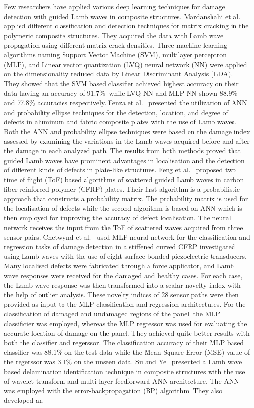 Few researchers have applied various deep learning techniques for damage detection with guided Lamb waves in composite structures. Mardanshahi et al.~\cite{mardanshahi2020detection} applied different classification and detection techniques for matrix cracking in the polymeric composite structures. They acquired the data with Lamb wave propagation using different matrix crack densities. Three machine learning algorithms naming Support Vector Machine (SVM), multilayer perceptron (MLP), and Linear vector quantization (LVQ) neural network (NN) were applied on the dimensionality reduced data by Linear Discriminant Analysis (LDA). They showed that the SVM based classifier achieved highest accuracy on their data having an accuracy of 91.7\%, while LVQ NN and MLP NN shown 88.9\% and 77.8\% accuracies respectively. Fenza et al.~\cite{de2015application} presented the utilization of ANN and probability ellipse techniques for the detection, location, and degree of defects in aluminum and fabric composite plates with the use of Lamb waves. Both the ANN and probability ellipse techniques were based on the damage index assessed by examining the variations in the Lamb waves acquired before and after the damage in each analyzed path. The results from both methods proved that guided Lamb waves have prominent advantages in localisation and the detection of different kinds of defects in plate-like structures. Feng et al.~\cite{feng2019locating} proposed two time of flight (ToF) based algorithms of scattered guided Lamb waves in carbon fiber reinforced polymer (CFRP) plates. Their first algorithm is a probabilistic approach that constructs a probability matrix. The probability matrix is used for the localisation of defects while the second algorithm is based on ANN which is then employed for improving the accuracy of defect localisation. The neural network receives the input from the ToF of scattered waves acquired from three sensor pairs. Chetwynd et al.~\cite{chetwynd2008damage} used MLP neural network for the classification and regression tasks of damage detection in a stiffened curved CFRP investigated using Lamb waves with the use of eight surface bonded piezoelectric transducers. Many localised defects were fabricated through a force applicator, and Lamb wave responses were received for the damaged and healthy cases. For each case, the Lamb wave response was then transformed into a scalar novelty index with the help of outlier analysis. These novelty indices of 28 sensor paths were then provided as input to the MLP classification and regression architectures. For the classification of damaged and undamaged regions of the panel, the MLP classificier was employed, whereas the MLP regressor was used for evaluating the accurate location of damage on the panel. They achieved quite better results with both the classifier and regerssor. The classification accuracy of their MLP based classifier was 88.1\% on the test data while the Mean Square Error (MSE) value of the regerssor was 3.1\% on the unseen data. Su and Ye~\cite{su2004lamb} presented a Lamb wave based delamination identification technique in composite structures with the use of wavelet transform and multi-layer feedforward ANN architecture. The ANN was employed with the error-backpropagation (BP) algorithm. They also developed an 
